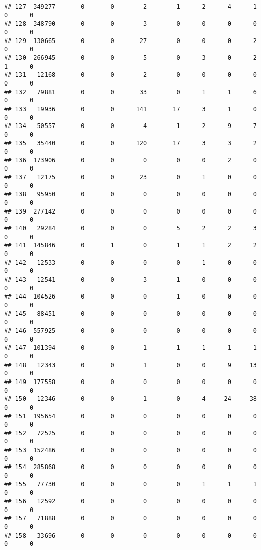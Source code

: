 \documentclass[
]{article}
\begin{document}
\begin{verbatim}
## 127  349277       0       0        2        1      2      4      1     0      0
## 128  348790       0       0        3        0      0      0      0     0      0
## 129  130665       0       0       27        0      0      0      2     0      0
## 130  266945       0       0        5        0      3      0      2     1      0
## 131   12168       0       0        2        0      0      0      0     0      0
## 132   79881       0       0       33        0      1      1      6     0      0
## 133   19936       0       0      141       17      3      1      0     0      0
## 134   50557       0       0        4        1      2      9      7     0      0
## 135   35440       0       0      120       17      3      3      2     0      0
## 136  173906       0       0        0        0      0      2      0     0      0
## 137   12175       0       0       23        0      1      0      0     0      0
## 138   95950       0       0        0        0      0      0      0     0      0
## 139  277142       0       0        0        0      0      0      0     0      0
## 140   29284       0       0        0        5      2      2      3     0      0
## 141  145846       0       1        0        1      1      2      2     0      0
## 142   12533       0       0        0        0      1      0      0     0      0
## 143   12541       0       0        3        1      0      0      0     0      0
## 144  104526       0       0        0        1      0      0      0     0      0
## 145   88451       0       0        0        0      0      0      0     0      0
## 146  557925       0       0        0        0      0      0      0     0      0
## 147  101394       0       0        1        1      1      1      1     0      0
## 148   12343       0       0        1        0      0      9     13     0      0
## 149  177558       0       0        0        0      0      0      0     0      0
## 150   12346       0       0        1        0      4     24     38     0      0
## 151  195654       0       0        0        0      0      0      0     0      0
## 152   72525       0       0        0        0      0      0      0     0      0
## 153  152486       0       0        0        0      0      0      0     0      0
## 154  285868       0       0        0        0      0      0      0     0      0
## 155   77730       0       0        0        0      1      1      1     0      0
## 156   12592       0       0        0        0      0      0      0     0      0
## 157   71888       0       0        0        0      0      0      0     0      0
## 158   33696       0       0        0        0      0      0      0     0      0

\end{verbatim}
\end{document}
